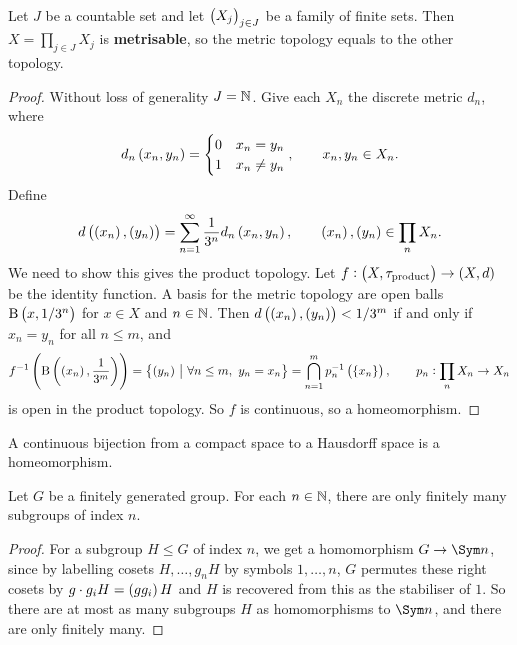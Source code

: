 \begin{proposition}
Let $ J $ be a countable set and let $ \br{X_j}_{j \in J} $ be a family of finite sets. Then $ X = \prod_{j \in J} X_j $ is \textbf{metrisable}, so the metric topology equals to the other topology.
\end{proposition}

\begin{proof}
Without loss of generality $ J = \mathbb{N} $. Give each $ X_n $ the discrete metric $ d_n $, where
$$ d_n\br{x_n, y_n} =
\begin{cases}
0 & x_n = y_n \\
1 & x_n \ne y_n
\end{cases},
\qquad x_n, y_n \in X_n. $$
Define
$$ d\br{\br{x_n}, \br{y_n}} = \sum_{n = 1}^\infty \dfrac{1}{3^n}d_n\br{x_n, y_n}, \qquad \br{x_n}, \br{y_n} \in \prod_n X_n. $$
We need to show this gives the product topology. Let $ f : \br{X, \tau_{\text{product}}} \to \br{X, d} $ be the identity function. A basis for the metric topology are open balls $ \B\br{x, 1 / 3^n} $ for $ x \in X $ and $ n \in \mathbb{N} $. Then $ d\br{\br{x_n}, \br{y_n}} < 1 / 3^m $ if and only if $ x_n = y_n $ for all $ n \le m $, and
$$ f^{-1}\br{\B\br{\br{x_n}, \dfrac{1}{3^m}}} = \cbr{\br{y_n} \st \forall n \le m, \ y_n = x_n} = \bigcap_{n = 1}^m p_n^{-1}\br{\cbr{x_n}}, \qquad p_n : \prod_n X_n \to X_n $$
is open in the product topology. So $ f $ is continuous, so a homeomorphism.
\end{proof}

\begin{proposition}
A continuous bijection from a compact space to a Hausdorff space is a homeomorphism.
\end{proposition}

\begin{lemma}
\label{lem:1.2.18}
Let $ G $ be a finitely generated group. For each $ n \in \mathbb{N} $, there are only finitely many subgroups of index $ n $.
\end{lemma}

\begin{proof}
For a subgroup $ H \le G $ of index $ n $, we get a homomorphism $ G \to \Sym n $, since by labelling cosets $ H, \dots, g_nH $ by symbols $ 1, \dots, n $, $ G $ permutes these right cosets by $ g \cdot g_iH = \br{gg_i}H $ and $ H $ is recovered from this as the stabiliser of $ 1 $. So there are at most as many subgroups $ H $ as homomorphisms to $ \Sym n $, and there are only finitely many.
\end{proof}

